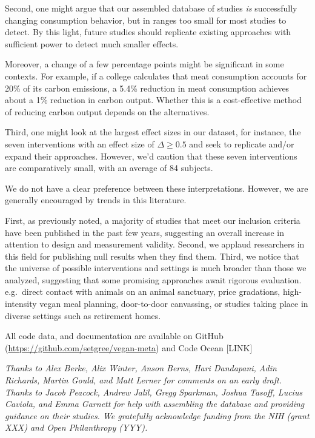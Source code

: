 \documentclass[sn-nature,pdflatex]{sn-jnl}
\begin{document}
Second, one might argue that our assembled database of studies \emph{is}
successfully changing consumption behavior, but in ranges too small for
most studies to detect. By this light, future studies should replicate
existing approaches with sufficient power to detect much smaller
effects.

Moreover, a change of a few percentage points might be significant in
some contexts. For example, if a college calculates that meat
consumption accounts for 20\% of its carbon emissions, a 5.4\% reduction
in meat consumption \citep{jalil2023} achieves about a 1\% reduction in
carbon output. Whether this is a cost-effective method of reducing
carbon output depends on the alternatives.

Third, one might look at the largest effect sizes in our dataset, for
instance, the seven interventions with an effect size of
\(\Delta \geq 0.5\)
\citep{bianchi2022, carfora2023, merrill2009, piester2020} and seek to
replicate and/or expand their approaches. However, we'd caution that
these seven interventions are comparatively small, with an average of 84
subjects.

We do not have a clear preference between these interpretations.
However, we are generally encouraged by trends in this literature.

First, as previously noted, a majority of studies that meet our
inclusion criteria have been published in the past few years, suggesting
an overall increase in attention to design and measurement validity.
Second, we applaud researchers in this field for publishing null results
when they find them. Third, we notice that the universe of possible
interventions and settings is much broader than those we analyzed,
suggesting that some promising approaches await rigorous evaluation.
e.g.~direct contact with animals on an animal sanctuary, price
gradations, high-intensity vegan meal planning, door-to-door canvassing,
or studies taking place in diverse settings such as retirement homes.

\backmatter


All code data, and documentation are available on GitHub
(\url{https://github.com/setgree/vegan-meta}) and Code Ocean {[}LINK{]}


\emph{Thanks to Alex Berke, Alix Winter, Anson Berns, Hari Dandapani,
Adin Richards, Martin Gould, and Matt Lerner for comments on an early
draft. Thanks to Jacob Peacock, Andrew Jalil, Gregg Sparkman, Joshua
Tasoff, Lucius Caviola, and Emma Garnett for help with assembling the
database and providing guidance on their studies. We gratefully
acknowledge funding from the NIH (grant XXX) and Open Philanthropy
(YYY).}
\end{document}
